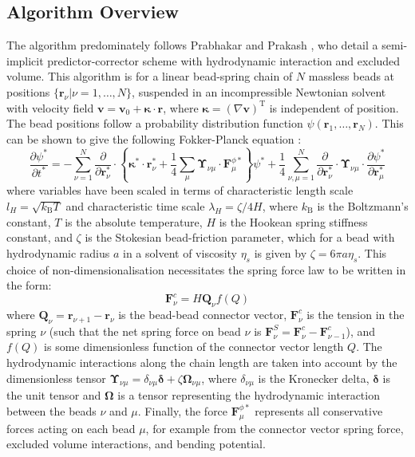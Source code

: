 \documentclass{article}
\begin{document}
\subsection{Algorithm Overview}
The algorithm predominately follows Prabhakar and Prakash \cite{Prabhakar2004}, who detail a semi-implicit predictor-corrector scheme with hydrodynamic interaction and excluded volume.
This algorithm is for a linear bead-spring chain of $N$ massless beads at positions $\{\bm{r}_\nu | \nu=1,\dots,N\}$, suspended in an incompressible Newtonian solvent with velocity field $\bm{v} = \bm{v}_0 + \bm{\kappa} \cdot \bm{r}$, where $\bm{\kappa}=(\nabla \bm{v})^{\mathrm{T}}$ is independent of position.
The bead positions follow a probability distribution function $\psi\left(\bm{r}_{1}, \ldots, \bm{r}_{N}\right)$.
This can be shown to give the following Fokker-Planck equation \cite{Bird1987}:
\begin{equation}
\label{Fokker-Planck equation}
    \frac{\partial \psi^{*}}{\partial t^{*}}=-\sum_{\nu=1}^{N} \frac{\partial}{\partial \bm{r}_{\nu}^{*}} \cdot\left\{\bm{\kappa}^{*} \cdot \bm{r}_{\nu}^{*}+\frac{1}{4} \sum_{\mu} \bm{\Upsilon}_{\nu \mu} \cdot \bm{F}_{\mu}^{\phi *}\right\} \psi^{*}+\frac{1}{4} \sum_{\nu, \mu=1}^{N} \frac{\partial}{\partial \bm{r}_{\nu}^{*}} \cdot \bm{\Upsilon}_{\nu \mu} \cdot \frac{\partial \psi^{*}}{\partial \bm{r}_{\mu}^{*}}
\end{equation}
where variables have been scaled in terms of characteristic length scale $l_H = \sqrt{k_\mathrm{B} T}$ and characteristic time scale $\lambda_H = \zeta/4H$, where $k_\mathrm{B}$ is the Boltzmann's constant, $T$ is the absolute temperature, $H$ is the Hookean spring stiffness constant, and $\zeta$ is the Stokesian bead-friction parameter, which for a bead with hydrodynamic radius $a$ in a solvent of viscosity $\eta_s$ is given by $\zeta = 6 \pi a \eta_s$.
This choice of non-dimensionalisation necessitates the spring force law to be written in the form:
\begin{equation}
    \bm{F}^{c}_\nu = H \bm{Q}_\nu f(Q)
\end{equation}
where $\bm{Q}_\nu = \bm{r}_{\nu+1} - \bm{r}_\nu$ is the bead-bead connector vector, $\bm{F}^{c}_\nu$ is the tension in the spring $\nu$ (such that the net spring force on bead $\nu$ is $\bm{F}^{S}_\nu = \bm{F}^{c}_\nu - \bm{F}^{c}_{\nu-1}$), and $f(Q)$ is some dimensionless function of the connector vector length $Q$. 
The hydrodynamic interactions along the chain length are taken into account by the dimensionless tensor $\bm{\Upsilon}_{\nu \mu} = \delta_{\nu \mu} \bm{\delta} + \zeta \bm{\Omega}_{\nu \mu}$, where $\delta_{\nu \mu}$ is the Kronecker delta, $\bm{\delta}$ is the unit tensor and $\bm{\Omega}$ is a tensor representing the hydrodynamic interaction between the beads $\nu$ and $\mu$.
Finally, the force $\bm{F}_{\mu}^{\phi *}$ represents all conservative forces acting on each bead $\mu$, for example from the connector vector spring force, excluded volume interactions, and bending potential.
\end{document}
